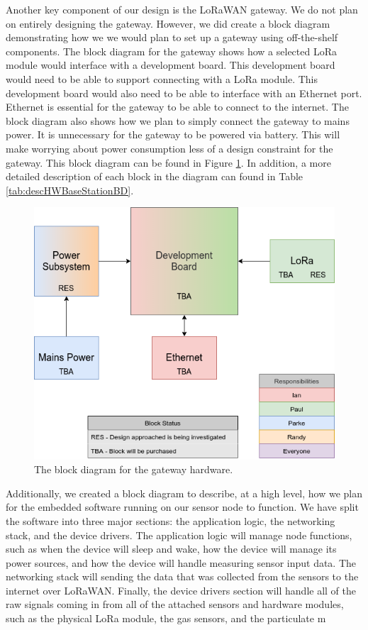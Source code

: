 Another key component of our design is the LoRaWAN gateway. We do not plan on entirely designing the gateway. However, we did create a block diagram demonstrating how we we would plan to set up a gateway using off-the-shelf components. The block diagram for the gateway shows how a selected LoRa module would interface with a development board. This development board would need to be able to support connecting with a LoRa module. This development board would also need to be able to interface with an Ethernet port. Ethernet is essential for the gateway to be able to connect to the internet. The block diagram also shows how we plan to simply connect the gateway to mains power. It is unnecessary for the gateway to be powered via battery. This will make worrying about power consumption less of a design constraint for the gateway. This block diagram can be found in Figure \ref{fig:hwBaseStationBD}. In addition, a more detailed description of each block in the diagram can found in Table \ref{tab:descHWBaseStationBD}.

\begin{figure}[H]
    \centering
    \includegraphics[width=5.3in]{"./figures/hwGatewayBD.png"} 
    \caption{The block diagram for the gateway hardware.}
    \label{fig:hwBaseStationBD}
\end{figure}

Additionally, we created a block diagram to describe, at a high level, how we plan for the embedded software running on our sensor node to function. We have split the software into three major sections: the application logic, the networking stack, and the device drivers. The application logic will manage node functions, such as when the device will sleep and wake, how the device will manage its power sources, and how the device will handle measuring sensor input data. The networking stack will sending the data that was collected from the sensors to the internet over LoRaWAN. Finally, the device drivers section will handle all of the raw signals coming in from all of the attached sensors and hardware modules, such as the physical LoRa module, the gas sensors, and the particulate m


